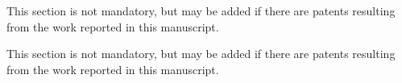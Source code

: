 \documentclass[journal,article,submit,pdftex,moreauthors]{Definitions/mdpi}
\begin{document}
This section is not mandatory, but may be added if there are patents resulting from the work reported in this manuscript.

This section is not mandatory, but may be added if there are patents resulting from the work reported in this manuscript.

\vspace{6pt} 




\end{document}
